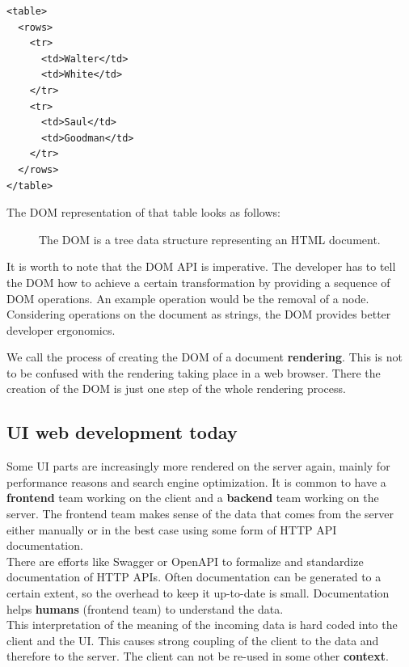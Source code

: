 \lstset{language=XML}
\begin{lstlisting}[caption=HTML document of a table, label=htmloftable]
<table>
  <rows>
    <tr>
      <td>Walter</td>
      <td>White</td>
    </tr>
    <tr>
      <td>Saul</td>
      <td>Goodman</td>
    </tr>
  </rows>
</table>
\end{lstlisting}

The DOM representation of that table looks as follows:

\begin{figure}[!htb]
  \caption{The DOM is a tree data structure representing an HTML document.}
\end{figure}

It is worth to note that the DOM API is imperative. The developer has to tell the DOM how to achieve a certain transformation by providing a sequence of DOM operations. An example operation would be the removal of a node. Considering operations on the document as strings, the DOM provides better developer ergonomics.

We call the process of creating the DOM of a document \textbf{rendering}. This is not to be confused with the rendering taking place in a web browser. There the creation of the DOM is just one step of the whole rendering process.

\subsection{UI web development today}\label{uidevelopmenttoday}
Some UI parts are increasingly more rendered on the server again, mainly for performance reasons and search engine optimization. It is common to have a \textbf{frontend} team working on the client and a \textbf{backend} team working on the server. The frontend team makes sense of the data that comes from the server either manually or in the best case using some form of HTTP API documentation.
\\ There are efforts like Swagger or OpenAPI to formalize and standardize documentation of HTTP APIs. Often documentation can be generated to a certain extent, so the overhead to keep it up-to-date is small. Documentation helps \textbf{humans} (frontend team) to understand the data.
\\ This interpretation of the meaning of the incoming data is hard coded into the client and the UI. This causes strong coupling of the client to the data and therefore to the server. The client can not be re-used in some other \textbf{context}.

